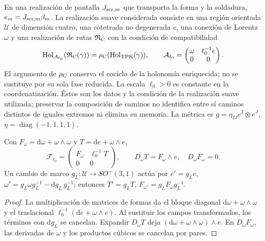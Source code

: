 En una realización de pantalla \(J_{{\rm scr},m}\) que transporta
la forma y la soldadura, \(e_m=J_{{\rm scr},m}\beta_m\).
La realización suave considerada consiste en una región orientada
\(\mathcal U\) de dimensión cuatro, una cotetrada no degenerada
\(e\), una conexión de Lorentz \(\omega\) y una realización de rutas
\(\mathfrak R_{\rm C}\) con la condición de compatibilidad
\begin{equation}
 \operatorname{Hol}_{\mathcal A_{\ell_0}}
          (\mathfrak R_{\rm C}(\gamma))
 =\rho_{\rm C}(\operatorname{Hol}_{\rm TPK}(\gamma)),\qquad
 \mathcal A_{\ell_0}=
 \begin{pmatrix}\omega&\ell_0^{-1}e\\0&0\end{pmatrix}.
\label{hmtcuatro:ant:compatibilidad-holonomia}
\end{equation}
El argumento de \(\rho_{\rm C}\) conserva el cociclo de la
holonomía enriquecida; no se sustituye por su sola fase reducida.
La escala \(\ell_0>0\) es constante en la coordenatización. Éstos
son los datos y la condición de la realización suave utilizada;
preservar la composición de caminos no identifica entre sí caminos
distintos de iguales extremos ni elimina su memoria. La métrica
es \(g=\eta_{IJ}e^I\otimes e^J\), \(\eta=\operatorname{diag}(-1,1,1,1)\).

\begin{proposition}
\label{hmtcuatro:ant:curvatura}
Con \(F_\omega=\mathrm d\omega+\omega\wedge\omega\) y
\(T=\mathrm de+\omega\wedge e\),
\[
 \mathcal F_{\ell_0}=
 \begin{pmatrix}F_\omega&\ell_0^{-1}T\\0&0\end{pmatrix},
 \qquad D_\omega T=F_\omega\wedge e,\quad D_\omega F_\omega=0 .
\]
Un cambio de marco \(g_L:\mathcal U\to SO^+(3,1)\) actúa por
\(e'=g_Le\),
\(\omega'=g_L\omega g_L^{-1}-\mathrm dg_L\,g_L^{-1}\);
entonces \(T'=g_LT\), \(F_{\omega'}=g_LF_\omega g_L^{-1}\).
\end{proposition}
\begin{proof}
La multiplicación de matrices de formas da el bloque diagonal
\(\mathrm d\omega+\omega\wedge\omega\) y el traslacional
\(\ell_0^{-1}(\mathrm de+\omega\wedge e)\). Al sustituir los
campos transformados, los términos con \(\mathrm dg_L\) se
cancelan. Expandir \(D_\omega T\) deja
\((\mathrm d\omega+\omega\wedge\omega)\wedge e\).
En \(D_\omega F_\omega\), las derivadas de \(\omega\) y los
productos cúbicos se cancelan por pares.
\end{proof}

